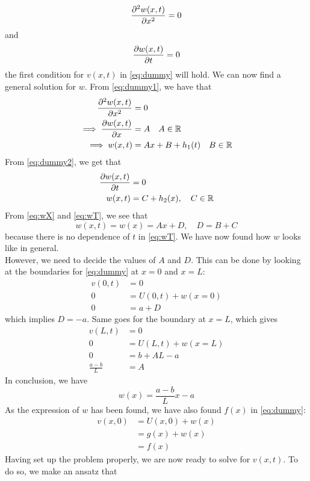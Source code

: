 \documentclass[12pt,english,a4paper]{article}
\begin{document}
\begin{equation} \label{eq:dummy1}
 \pdv[2]{w(x,t)}{x}  = 0
\end{equation}
and
\begin{equation} \label{eq:dummy2}
 \pdv{w(x,t)}{t} = 0
\end{equation}
the first condition for \(v(x,t)\) in \vref{eq:dummy} will hold. We can now find a general solution for \(w\). From \vref{eq:dummy1}, we have that
\begin{align}
	\pdv[2]{w(x,t)}{x}  &= 0 \nonumber \\
	\implies\pdv{w(x,t)}{x} &= A  \quad A \in \mathbb{R} \nonumber \\
	\implies w(x,t) &= Ax + B + h_1(t) \quad B \in \mathbb{R} \label{eq:wX}
\end{align}
From \vref{eq:dummy2}, we get that
\begin{align}
\pdv{w(x,t)}{t} &= 0 \nonumber \\
w(x,t) &= C + h_2(x) , \quad C \in \mathbb{R} \label{eq:wT}
\end{align}
From \vref{eq:wX} and \vref{eq:wT}, we see that
\[
w(x,t) = w(x) = Ax + D, \quad D=B+C
\]
because there is no dependence of \(t\) in \vref{eq:wT}.
We have now found how \(w\) looks like in general. \\
However, we need to decide the values of \(A\) and \(D\). This can be done by looking at the boundaries for \vref{eq:dummy} at \(x = 0 \) and \(x = L\):
\begin{align*}
v(0,t) &= 0 \\
0 &= U(0,t) + w(x=0) \\
0 &= a+D
\end{align*}
which implies \(D = -a\). Same goes for the boundary at \(x = L\), which gives
\begin{align*}
v(L,t) &= 0 \\
0 &= U(L,t) + w(x=L) \\
0 &= b+AL-a \\
\frac{a-b}{L} &= A
\end{align*}
In conclusion, we have
\[
w(x) = \frac{a-b}{L}x - a
\]
As the expression of \(w\) has been found, we have also found \(f(x)\) in \vref{eq:dummy}:
\begin{align*}
	v(x,0) &= U(x,0) + w(x) \\
	&= g(x)+w(x) \\
	&=f(x)
\end{align*}
Having set up the problem properly, we are now ready to solve for \(v(x,t)\). To do so, we make an ansatz that
\end{document}
